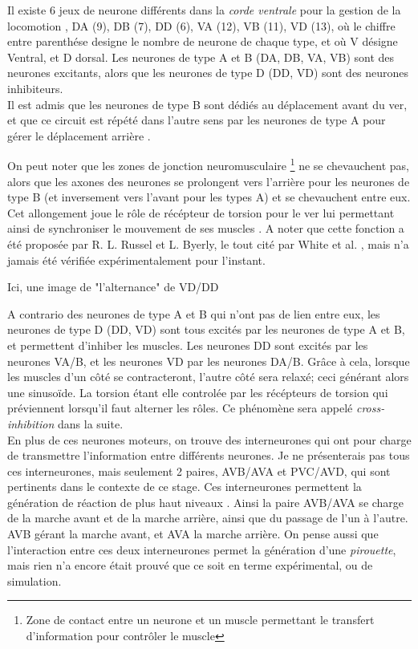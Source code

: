 Il existe 6 jeux de neurone différents dans la \textit{corde ventrale} pour la
gestion de la locomotion \cite{Boyle2009}, DA (9), DB (7), DD (6), VA (12), VB
(11), VD (13), où le chiffre entre parenthése designe le nombre de neurone de
chaque type, et où V désigne Ventral, et D dorsal.  Les neurones de type A et B
(DA, DB, VA, VB) sont des neurones excitants, alors que les neurones de type D
(DD, VD) sont des neurones inhibiteurs.\\


Il est admis que les neurones de type B sont dédiés au déplacement avant du ver,
et que ce circuit est répété dans l'autre sens par les neurones de type A
pour gérer le déplacement arrière \cite{AltunZ.F.andHall2011,Boyle2009,White1986}.

On peut noter que les zones de jonction neuromusculaire \footnote{Zone de
contact entre un neurone et un muscle permettant le transfert d'information 
pour contrôler le muscle} ne se chevauchent pas, alors que les axones
des neurones se prolongent vers l'arrière pour les neurones de type B (et
inversement vers l'avant pour les types A) et se chevauchent entre eux. Cet
allongement joue le rôle de récépteur de torsion pour le ver lui permettant
ainsi de synchroniser le mouvement de ses muscles \cite{Boyle2009}. A noter que
cette fonction a été proposée par R. L. Russel et L. Byerly, le tout cité par
White et al. \cite{White1986}, mais n'a jamais été vérifiée expérimentalement
pour l'instant.


\begin{center}
   Ici, une image de "l'alternance" de VD/DD
\end{center}
A contrario des neurones de type A et B qui n'ont pas de lien entre eux, les
neurones de type D (DD, VD) sont tous excités par les neurones de type A et B, 
et permettent d'inhiber les muscles. Les neurones DD sont excités par les neurones VA/B,
et les neurones VD par les neurones DA/B. Grâce à cela, lorsque les muscles d'un côté se 
contracteront, l'autre côté sera relaxé; ceci générant alors une
sinusoïde. La torsion étant elle controlée par les récépteurs de torsion qui
préviennent lorsqu'il faut alterner les rôles. Ce phénomène sera appelé
\textit{cross-inhibition} dans la suite.\\


En plus de ces neurones moteurs, on trouve des interneurones qui ont pour
charge de transmettre l'information entre différents neurones. Je ne
présenterais pas tous ces interneurones, mais seulement 2 paires, AVB/AVA et
PVC/AVD, qui sont pertinents dans le contexte de ce stage. Ces interneurones
permettent la génération de réaction de plus haut niveaux
\cite{Boyle2009,White1986}.  Ainsi la paire AVB/AVA se charge de la marche
avant et de la marche arrière, ainsi que du passage de l'un à l'autre. AVB gérant
la marche avant, et AVA la marche arrière. On pense aussi que l'interaction
entre ces deux interneurones permet la génération d'une \textit{pirouette},
mais rien n'a encore était prouvé que ce soit en terme expérimental, ou de
simulation.

